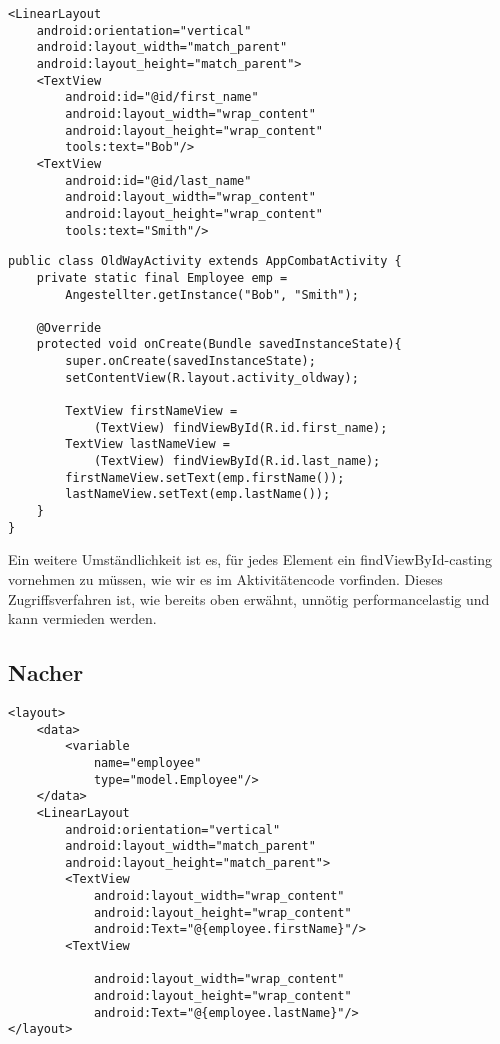 \documentclass[FIPLY_base.tex]{subfiles}
\begin{document}
\begin{lstlisting}[caption={XML Datei vor dem Einsatz von Databinding.},label=DescriptiveLabel]
<LinearLayout
	android:orientation="vertical"
	android:layout_width="match_parent"
	android:layout_height="match_parent">
	<TextView
		android:id="@id/first_name"
		android:layout_width="wrap_content"
		android:layout_height="wrap_content"
		tools:text="Bob"/>
	<TextView
		android:id="@id/last_name"
		android:layout_width="wrap_content"
		android:layout_height="wrap_content"
		tools:text="Smith"/>	
\end{lstlisting}


\begin{lstlisting}[caption={Die Activity vor dem Einsatz von DataBinding.},label=DescriptiveLabel]
public class OldWayActivity extends AppCombatActivity {
	private static final Employee emp = 
		Angestellter.getInstance("Bob", "Smith");
	
	@Override
	protected void onCreate(Bundle savedInstanceState){
		super.onCreate(savedInstanceState);
		setContentView(R.layout.activity_oldway);
		
		TextView firstNameView = 
			(TextView) findViewById(R.id.first_name);
		TextView lastNameView = 
			(TextView) findViewById(R.id.last_name);
		firstNameView.setText(emp.firstName());
		lastNameView.setText(emp.lastName());
	}
}
\end{lstlisting}


Ein weitere Umständlichkeit ist es, für jedes Element ein findViewById-casting vornehmen zu müssen, wie wir es im Aktivitätencode vorfinden. Dieses Zugriffsverfahren ist, wie bereits oben erwähnt, unnötig performancelastig und kann vermieden werden.
\subsection{Nacher}

\begin{lstlisting}[caption={XML Datei nach dem Einsatz von Databinding.},label=DescriptiveLabel]
<layout>
	<data>
		<variable
			name="employee"
			type="model.Employee"/>
	</data>
	<LinearLayout
		android:orientation="vertical"
		android:layout_width="match_parent"
		android:layout_height="match_parent">
		<TextView
			android:layout_width="wrap_content"
			android:layout_height="wrap_content"
			android:Text="@{employee.firstName}"/>
		<TextView
	
			android:layout_width="wrap_content"
			android:layout_height="wrap_content"
			android:Text="@{employee.lastName}"/>
</layout>	
\end{lstlisting}
\end{document}
